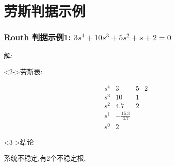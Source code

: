 \documentclass{beamer}
\begin{document}
\section{劳斯判据示例}
\label{sec-3}
\begin{frame}
\frametitle{Routh 判据示例1: $3s^{4}+10s^{3}+5s^{2}+s+2=0$}
\label{sec-3-1}


解:
\begin{block}<2->{劳斯表:}
\label{sec-3-1-1}

\begin{equation*}
\begin{matrix}
s^{4} & 3   &  5  &  2 \\
s^{3} & 10  &  1        \\
s^{2} & 4.7 &  2       \\
s^{1} & -\frac{15.3}{4.7}  \\
s^{0} & 2   
\end{matrix}
\end{equation*}
\end{block}
\begin{block}<3->{结论}
\label{sec-3-1-2}

系统不稳定,有2个不稳定根.
\end{block}
\end{frame}
\end{document}
